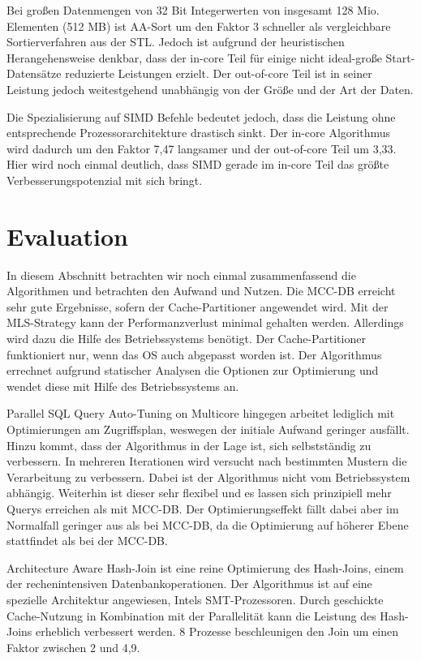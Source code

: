 Bei großen Datenmengen von 32 Bit Integerwerten von insgesamt 128 Mio. Elementen (512 MB) ist AA-Sort um den Faktor 3 schneller als vergleichbare Sortierverfahren aus der STL. Jedoch ist aufgrund der heuristischen Herangehensweise denkbar, dass der in-core Teil für einige nicht ideal-große Start-Datensätze reduzierte Leistungen erzielt. Der out-of-core Teil ist in seiner Leistung jedoch weitestgehend unabhängig von der Größe und der Art der Daten.

Die Spezialisierung auf SIMD Befehle bedeutet jedoch, dass die Leistung ohne entsprechende Prozessorarchitekture drastisch sinkt. Der in-core Algorithmus wird dadurch um den Faktor 7,47 langsamer und der out-of-core Teil um 3,33. Hier wird noch einmal deutlich, dass SIMD gerade im in-core Teil das größte Verbesserungspotenzial mit sich bringt.

\section{Evaluation}
\label{sec:Evaluation}
In diesem Abschnitt betrachten wir noch einmal zusammenfassend die Algorithmen und betrachten den Aufwand und Nutzen.
Die MCC-DB erreicht sehr gute Ergebnisse, sofern der Cache-Partitioner angewendet wird. Mit der MLS-Strategy kann der Performanzverlust minimal gehalten werden. Allerdings wird dazu die Hilfe des Betriebssystems benötigt. Der Cache-Partitioner funktioniert nur, wenn das OS auch abgepasst worden ist. Der Algorithmus errechnet aufgrund statischer Analysen die Optionen zur Optimierung und wendet diese mit Hilfe des Betriebssystems an.

Parallel SQL Query Auto-Tuning on Multicore hingegen arbeitet lediglich mit Optimierungen am Zugriffsplan, weswegen der initiale Aufwand geringer ausfällt. Hinzu kommt, dass der Algorithmus in der Lage ist, sich selbstständig zu verbessern. In mehreren Iterationen wird versucht nach bestimmten Mustern die Verarbeitung zu verbessern. Dabei ist der Algorithmus nicht vom Betriebssystem abhängig. Weiterhin ist dieser sehr flexibel und es lassen sich prinzipiell mehr Querys erreichen als mit MCC-DB. Der Optimierungseffekt fällt dabei aber im Normalfall geringer aus als bei MCC-DB, da die Optimierung auf höherer Ebene stattfindet als bei der MCC-DB.

Architecture Aware Hash-Join ist eine reine Optimierung des Hash-Joins, einem der rechenintensiven Datenbankoperationen. Der Algorithmus ist auf eine spezielle Architektur angewiesen, Intels SMT-Prozessoren. Durch geschickte Cache-Nutzung in Kombination mit der Parallelität kann die Leistung des Hash-Joins erheblich verbessert werden. 8 Prozesse beschleunigen den Join um einen Faktor zwischen 2 und 4,9. 

